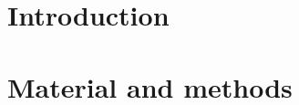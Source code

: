 \documentclass[final,1p,times,authoryear]{elsarticle}
\begin{document}
\begin{frontmatter}






\begin{keyword}



\end{keyword}

\end{frontmatter}



\section{Introduction}


\section{Material and methods}
\end{document}
